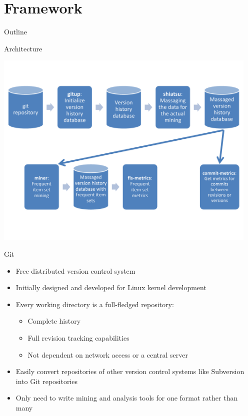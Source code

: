 \section{Framework}

\begin{frame}{Outline}
  \tableofcontents[current]
\end{frame}

\note{
}

\begin{frame}{Architecture}
  \begin{center}
    \includegraphics[width=0.95\textwidth]{figures/miner-architecture}
  \end{center}
\end{frame}


\begin{frame}{Git}
  \begin{itemize}
  \item Free distributed version control system
  \item Initially designed and developed for Linux kernel development
  \item Every working directory is a full-fledged repository:
    \begin{itemize}
    \item Complete history
    \item Full revision tracking capabilities
    \item Not dependent on network access or a central server
    \end{itemize}
  \item Easily convert repositories of other version control systems
    like Subversion into Git repositories
  \item Only need to write mining and analysis tools for one format
    rather than many
  \end{itemize}
\end{frame}

